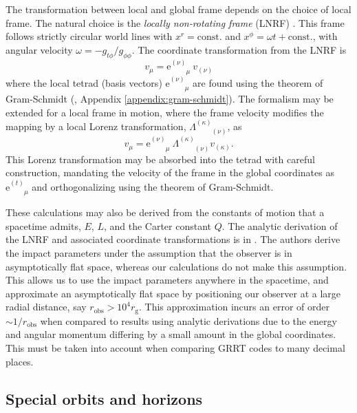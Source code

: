 \documentclass[fleqn,usenatbib]{mnras}
\newcommand{\e}{\text{e}}
\newcommand{\rg}{r_\text{g}}
\newcommand{\utensor}[3]{#1^{#2}_{\phantom{#2}#3}}
\begin{document}
The transformation between local and global frame depends on the choice of local
frame. The natural choice is the \emph{locally non-rotating frame} (LNRF)
\citep{bardeen_rotating_1972}. This frame follows strictly
circular world lines with $x^r = \text{const.}$ and $x^\phi = \omega t +
\text{const.}$, with angular velocity $\omega = -g_{t\phi} / g_{\phi\phi}$. The
coordinate transformation from the LNRF is
\begin{equation}
    \label{eq:local-to-global-velocity}
    v_\mu = \e^{(\nu)}_{\phantom{(\nu)}\mu}\  v_{(\nu)}
\end{equation}
where the local tetrad (basis vectors) $\e^{(\nu)}_{\phantom{(\nu)}\mu}$ are found
using the theorem of Gram-Schmidt (\citealp{schmidt_uber_1989}, Appendix
\ref{appendix:gram-schmidt}). The formalism may be extended for a local frame
in motion, where the frame velocity modifies the mapping by a local Lorenz
transformation, $\Lambda^{(\kappa)}_{\phantom{(\kappa)}(\nu)}$, as
\begin{equation}
    v_\mu = \e^{(\nu)}_{\phantom{(\nu)}\mu}\  \Lambda^{(\kappa)}_{\phantom{(a)}(\nu)} v_{(\kappa)}.
\end{equation}
This Lorenz transformation may be absorbed into the tetrad with careful
construction, mandating the velocity of the frame in the global coordinates as
$\utensor{\e}{(t)}{\mu}$ and orthogonalizing using the theorem of Gram-Schmidt.

These calculations may also be derived from the constants of motion that a
spacetime admits, $E$, $L$, and the Carter constant $Q$. The analytic
derivation of the LNRF and associated coordinate transformations is in
\cite{cunningham_optical_1973}. The authors derive the impact parameters under
the assumption that the observer is in asymptotically flat space, whereas our
calculations do not make this assumption. This allows us to use the impact
parameters anywhere in the spacetime, and approximate an asymptotically flat
space by positioning our observer at a large radial distance, say $r_\text{obs}
> 10^4 \rg$. This approximation incurs an error of order $\sim1/r_\text{obs}$
when compared to results using analytic derivations due to the energy and
angular momentum differing by a small amount in the global coordinates. This
must be taken into account when comparing GRRT codes to many decimal places.

\subsection{Special orbits and horizons}
\label{sec:special-orbits}
\end{document}
